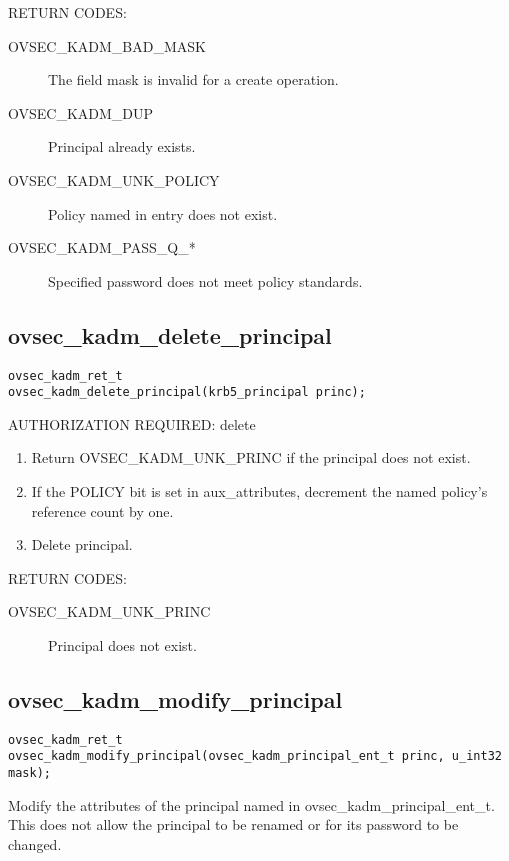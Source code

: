 RETURN CODES:

\begin{description}
\item[OVSEC_KADM_BAD_MASK] The field mask is invalid for a create
operation.
\item[OVSEC_KADM_DUP] Principal already exists.
\item[OVSEC_KADM_UNK_POLICY] Policy named in entry does not exist.
\item[OVSEC_KADM_PASS_Q_*] Specified password does not meet policy
standards.
\end{description}

\subsection{ovsec_kadm_delete_principal}

\begin{verbatim}
ovsec_kadm_ret_t
ovsec_kadm_delete_principal(krb5_principal princ);
\end{verbatim}

AUTHORIZATION REQUIRED: delete 

\begin{enumerate}
\item Return OVSEC_KADM_UNK_PRINC if the principal does not exist.
\item If the POLICY bit is set in aux_attributes, decrement the named
policy's reference count by one.
\item Delete principal.
\end{enumerate}

RETURN CODES: 

\begin{description}
\item[OVSEC_KADM_UNK_PRINC] Principal does not exist.
\end{description}

\subsection{ovsec_kadm_modify_principal}

\begin{verbatim}
ovsec_kadm_ret_t
ovsec_kadm_modify_principal(ovsec_kadm_principal_ent_t princ, u_int32 mask);
\end{verbatim}

Modify the attributes of the principal named in
ovsec_kadm_principal_ent_t. This does not allow the principal to be
renamed or for its password to be changed.

